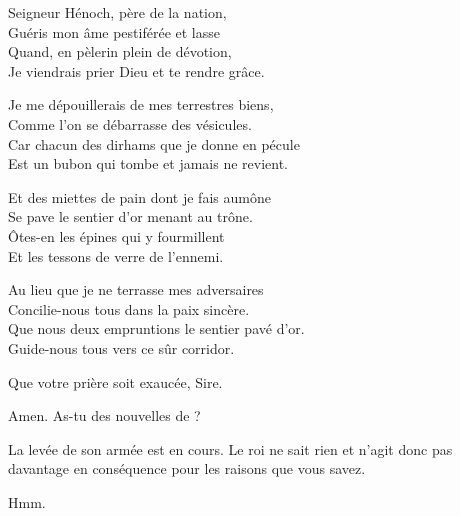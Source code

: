 \scene

\StageDirII{\elena, \alexas}\nopagebreak[4]
\nopagebreak[4]
\begin{drama}\nopagebreak[4]
  \elenaspeaks\nopagebreak[4]%
  \begin{minipage}[t]{\linewidth}
      Seigneur Hénoch, père de la nation,\\
      Guéris mon âme pestiférée et lasse\\
      Quand, en pèlerin plein de dévotion,\\
      Je viendrais prier Dieu et te rendre grâce.\vspace{1em}
      
      Je me dépouillerais de mes terrestres biens,\\
      Comme l’on se débarrasse des vésicules.\\
      Car chacun des dirhams que je donne en pécule\\
      Est un bubon qui tombe et jamais ne revient.\vspace{1em}
      
      Et des miettes de pain dont je fais aumône\\
      Se pave le sentier d’or menant au trône.\\
      Ôtes-en les épines qui y fourmillent\\
      Et les tessons de verre de l’ennemi.\vspace{1em}
      
      Au lieu que je ne terrasse mes adversaires\\
      Concilie-nous tous dans la paix sincère.\\
      Que nous deux empruntions le sentier pavé d’or.\\
      Guide-nous tous vers ce sûr corridor.\vspace{1em}


  \end{minipage}

  \alexasspeaks Que votre prière soit exaucée, Sire.

  \elenaspeaks Amen. As-tu des nouvelles de \general{} ?

  \alexasspeaks La levée de son armée est en cours. Le roi ne sait rien et n’agit donc pas davantage en conséquence pour les raisons que vous savez.

  \elenaspeaks {} Hmm.


\end{drama}
